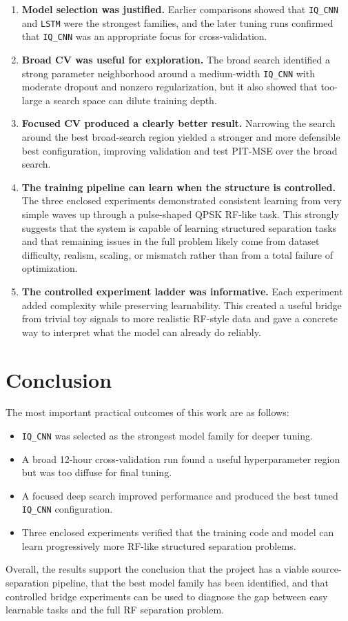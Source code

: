 \documentclass[11pt]{article}
\begin{document}
\begin{enumerate}
    \item \textbf{Model selection was justified.} Earlier comparisons showed that \texttt{IQ\_CNN} and \texttt{LSTM} were the strongest families, and the later tuning runs confirmed that \texttt{IQ\_CNN} was an appropriate focus for cross-validation.
    \item \textbf{Broad CV was useful for exploration.} The broad search identified a strong parameter neighborhood around a medium-width \texttt{IQ\_CNN} with moderate dropout and nonzero regularization, but it also showed that too-large a search space can dilute training depth.
    \item \textbf{Focused CV produced a clearly better result.} Narrowing the search around the best broad-search region yielded a stronger and more defensible best configuration, improving validation and test PIT-MSE over the broad search.
    \item \textbf{The training pipeline can learn when the structure is controlled.} The three enclosed experiments demonstrated consistent learning from very simple waves up through a pulse-shaped QPSK RF-like task. This strongly suggests that the system is capable of learning structured separation tasks and that remaining issues in the full problem likely come from dataset difficulty, realism, scaling, or mismatch rather than from a total failure of optimization.
    \item \textbf{The controlled experiment ladder was informative.} Each experiment added complexity while preserving learnability. This created a useful bridge from trivial toy signals to more realistic RF-style data and gave a concrete way to interpret what the model can already do reliably.
\end{enumerate}

\section{Conclusion}
The most important practical outcomes of this work are as follows:
\begin{itemize}
    \item \texttt{IQ\_CNN} was selected as the strongest model family for deeper tuning.
    \item A broad 12-hour cross-validation run found a useful hyperparameter region but was too diffuse for final tuning.
    \item A focused deep search improved performance and produced the best tuned \texttt{IQ\_CNN} configuration.
    \item Three enclosed experiments verified that the training code and model can learn progressively more RF-like structured separation problems.
\end{itemize}

Overall, the results support the conclusion that the project has a viable source-separation pipeline, that the best model family has been identified, and that controlled bridge experiments can be used to diagnose the gap between easy learnable tasks and the full RF separation problem.
\end{document}
